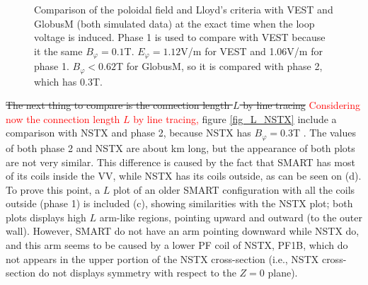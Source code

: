 \documentclass[a4paper,12pt,oneside]{book}
\begin{document}
%
\begin{figure}[htbp]
\centering
{}
\hfill
{}

\hfill
{}

\hfill
{}
\caption{Comparison of the poloidal field and Lloyd's criteria with VEST \cite{VEST_2015} and GlobusM \cite{Globus_2001} (both simulated data) at the exact time when the loop voltage is induced. Phase 1 is used to compare with VEST because it the same $B_\varphi=0.1$T. $E_\varphi=1.12$V/m for VEST and 1.06V/m for phase 1. $B_\varphi<0.62$T for GlobusM, so it is compared with phase 2, which has 0.3T.}
\label{fig_Bpol}
\end{figure}




\st{The next thing to compare is the connection length $L$ by line tracing} \textcolor{red}{Considering now the connection length $L$ by line tracing,} figure \ref{fig_L_NSTX} include a comparison with NSTX and phase 2, because NSTX has $B_\varphi=0.3$T \cite{NSTX_BT}. The values of both phase 2 and NSTX are about km long, but the appearance of both plots are not very similar. This difference is caused by the fact that SMART has most of its coils inside the VV, while NSTX has its coils outside, as can be seen on (d). To prove this point, a $L$ plot of an older SMART configuration with all the coils outside (phase 1) is included (c), showing similarities with the NSTX plot; both plots displays high $L$ arm-like regions, pointing upward and outward (to the outer wall). However, SMART do not have an arm pointing downward while NSTX do, and this arm seems to be caused by a lower PF coil of NSTX, PF1B, which do not appears in the upper portion of the NSTX cross-section (i.e., NSTX cross-section do not displays symmetry with respect to the $Z=0$ plane).
\end{document}

